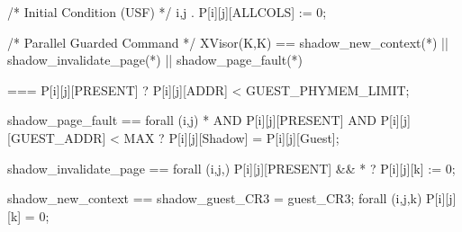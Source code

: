 

/* Initial Condition (USF) */
\forall i,j . P[i][j][ALLCOLS] := 0;

/* Parallel Guarded Command */
XVisor(K,K) == shadow_new_context(*) || shadow_invalidate_page(*) || shadow_page_fault(*)

\varphi === P[i][j][PRESENT] ? P[i][j][ADDR] < GUEST_PHYMEM_LIMIT;



shadow_page_fault ==
  forall (i,j) {
  * AND P[i][j][PRESENT] AND P[i][j][GUEST_ADDR] < MAX ? P[i][j][Shadow] = P[i][j][Guest];
}


shadow_invalidate_page ==
  forall (i,j,) {
  P[i][j][PRESENT] && * ? P[i][j][k] := 0;    
}


shadow_new_context ==
  shadow_guest_CR3 = guest_CR3;
forall (i,j,k) {
  P[i][j][k] = 0;
}

